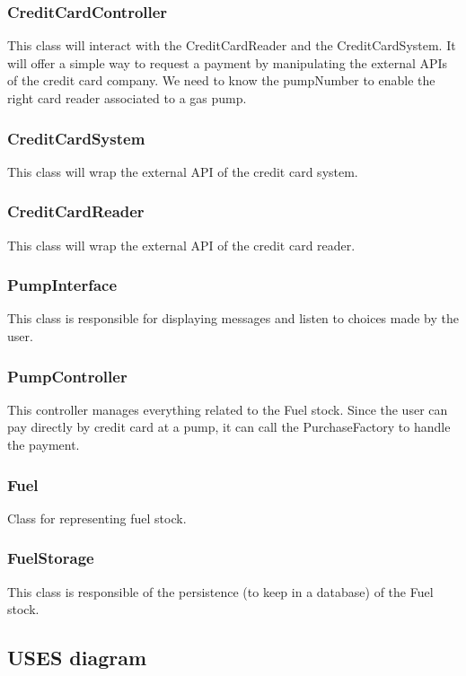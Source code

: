\documentclass[11pt, a4paper]{article}
\begin{document}
\subsubsection*{CreditCardController}
This class will interact with the CreditCardReader and the CreditCardSystem. It will offer a simple way to request a payment by manipulating the external APIs of the credit card company. We need to know the pumpNumber to enable the right card reader associated to a gas pump.

\subsubsection*{CreditCardSystem}
This class will wrap the external API of the credit card system.

\subsubsection*{CreditCardReader}
This class will wrap the external API of the credit card reader.

\subsubsection*{PumpInterface}
This class is responsible for displaying messages and listen to choices made by the user.

\subsubsection*{PumpController}
This controller manages everything related to the Fuel stock. Since the user can pay directly by credit card at a pump, it can call the PurchaseFactory to handle the payment.

\subsubsection*{Fuel}
Class for representing fuel stock.

\subsubsection*{FuelStorage}
This class is responsible of the persistence (to keep in a database) of the Fuel stock.


\subsection*{USES diagram}
\end{document}
